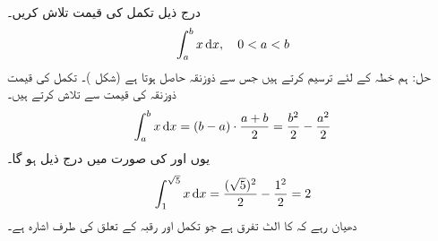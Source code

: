\\
درج ذیل تکمل کی قیمت تلاش کریں۔
\begin{align*}
\int_a^bx\dif x, \quad 0<a<b
\end{align*}
حل:\quad
ہم خطہ  کے لئے  ترسیم کرتے ہیں جس سے  ذوزنقہ حاصل ہوتا ہے (شکل )۔ تکمل کی قیمت ذوزنقہ کی قیمت سے تلاش کرتے ہیں۔
\begin{align*}
\int_a^b x\dif x=(b-a)\cdot \frac{a+b}{2}=\frac{b^2}{2}-\frac{a^2}{2}
\end{align*}  
یوں  اور  کی صورت میں درج ذیل ہو گا۔
\begin{align*}
\int_1^{\sqrt{5}} x\dif x=\frac{(\sqrt{5})^2}{2}-\frac{1^2}{2}=2
\end{align*} 
دھیان رہے کہ  کا الٹ تفرق  ہے جو تکمل اور رقبہ کے تعلق کی طرف اشارہ ہے۔ 
